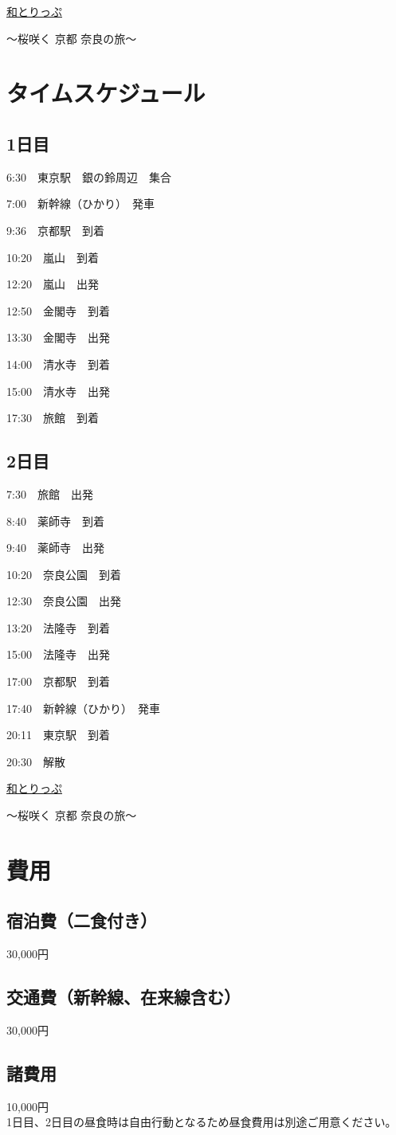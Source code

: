 \documentclass[12pt]{jarticle}
\begin{document}
\clearpage
\begin{center}
    {\Huge \underline{和とりっぷ}}

    〜桜咲く 京都 奈良の旅〜
\end{center}
\section{タイムスケジュール}
\subsection{1日目} 
6:30　東京駅　銀の鈴周辺　集合

7:00　新幹線（ひかり）　発車

9:36　京都駅　到着

10:20　嵐山　到着

12:20　嵐山　出発

12:50　金閣寺　到着

13:30　金閣寺　出発

14:00　清水寺　到着

15:00　清水寺　出発

17:30　旅館　到着

\subsection{2日目}
7:30　旅館　出発

8:40　薬師寺　到着

9:40　薬師寺　出発

10:20　奈良公園　到着

12:30　奈良公園　出発

13:20　法隆寺　到着

15:00　法隆寺　出発

17:00　京都駅　到着

17:40　新幹線（ひかり）　発車

20:11　東京駅　到着

20:30　解散

\clearpage
\begin{center}
    {\Huge \underline{和とりっぷ}}

    〜桜咲く 京都 奈良の旅〜
\end{center}
\section{費用}
\subsection{宿泊費（二食付き）} 
30,000円
\subsection{交通費（新幹線、在来線含む）} 
30,000円
\subsection{諸費用} 
10,000円\\


{\footnotesize * 1日目、2日目の昼食時は自由行動となるため昼食費用は別途ご用意ください。}
\end{document}
